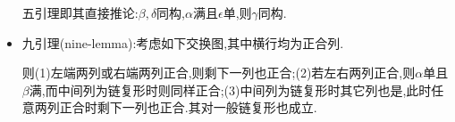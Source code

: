 \documentclass[11pt]{article} %
\begin{document}
\begin{itemize}
    五引理即其直接推论:$\beta,\delta$同构,$\alpha$满且$\epsilon$单,则$\gamma$同构.
    \item 九引理(nine-lemma):考虑如下交换图,其中横行均为正合列.
    \begin{center}
    \end{center}
    则(1)左端两列或右端两列正合,则剩下一列也正合;(2)若左右两列正合,则$\alpha$单且$\beta$满,而中间列为链复形时则同样正合;(3)中间列为链复形时其它列也是,此时任意两列正合时剩下一列也正合.其对一般链复形也成立.
\end{itemize}
\end{document}
